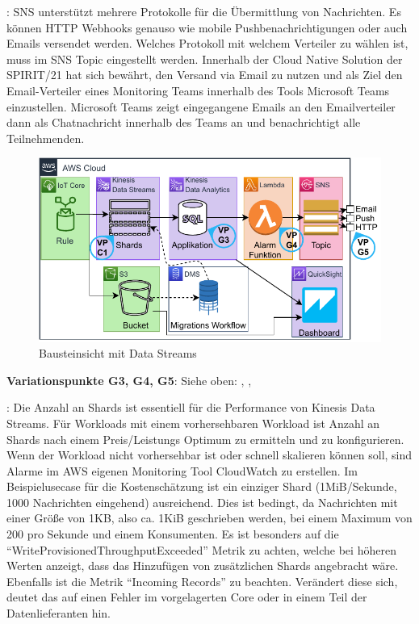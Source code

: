 : \ac{SNS} unterstützt mehrere Protokolle für die Übermittlung von Nachrichten. Es können HTTP Webhooks genauso wie mobile Pushbenachrichtigungen oder auch Emails versendet werden. Welches Protokoll mit welchem Verteiler zu wählen ist, muss im \ac{SNS} Topic eingestellt werden. Innerhalb der Cloud Native Solution der SPIRIT/21 hat sich bewährt, den Versand via Email zu nutzen und als Ziel den Email-Verteiler eines Monitoring Teams innerhalb des Tools Microsoft Teams einzustellen. Microsoft Teams zeigt eingegangene Emails an den Emailverteiler dann als Chatnachricht innerhalb des Teams an und benachrichtigt alle Teilnehmenden.

\begin{figure}[H]
\centering
\includegraphics[width=\textwidth]{graphics/Echtzeit-RA-Elements.pdf}
\caption{Bausteinsicht mit Data Streams}
\label{abb:ElementeEchtzeitRAStreams}
\end{figure}
\textbf{Variationspunkte G3, G4, G5}: Siehe oben: , , 

: Die Anzahl an Shards ist essentiell für die Performance von Kinesis Data Streams. Für Workloads mit einem vorhersehbaren Workload ist Anzahl an Shards nach einem Preis/Leistungs Optimum zu ermitteln und zu konfigurieren. Wenn der Workload nicht vorhersehbar ist oder schnell skalieren können soll, sind Alarme im AWS eigenen Monitoring Tool CloudWatch zu erstellen. Im Beispielusecase für die Kostenschätzung ist ein einziger Shard (1MiB/Sekunde, 1000 Nachrichten eingehend) ausreichend. Dies ist bedingt, da Nachrichten mit einer Größe von 1KB, also ca. 1KiB geschrieben werden, bei einem Maximum von 200 pro Sekunde und einem Konsumenten. Es ist besonders auf die \enquote{WriteProvisionedThroughputExceeded} Metrik zu achten, welche bei höheren Werten anzeigt, dass das Hinzufügen von zusätzlichen Shards angebracht wäre. Ebenfalls ist die Metrik \enquote{Incoming Records} zu beachten. Verändert diese sich, deutet das auf einen Fehler im vorgelagerten \AWSIOT{} Core oder in einem Teil der Datenlieferanten hin.

